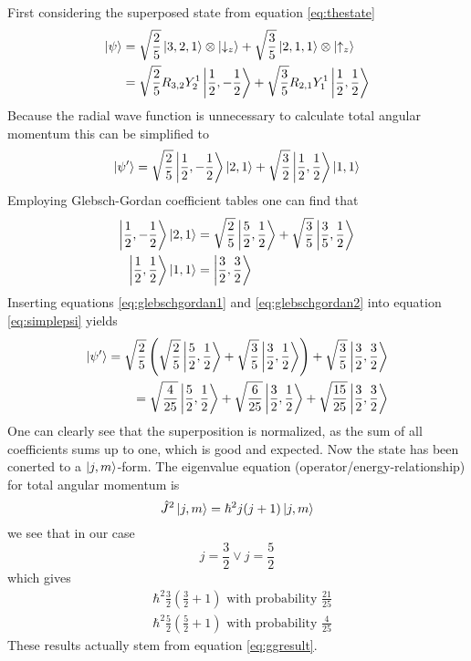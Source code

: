 \documentclass[]{article}
\begin{document}
First considering the superposed state from equation \ref{eq:thestate}
\begin{align*}
\ket{\psi}
&=\sqrt{\frac{2}{5}}\ket{3,2,1}\otimes\ket{\downarrow_z}
+ \sqrt{\frac{3}{5}}\ket{2,1,1}\otimes\ket{\uparrow_z} \\
&=\sqrt{\frac{2}{5}}R_{3,2}Y_2^1\ket{\frac{1}{2},-\frac{1}{2}}
+ \sqrt{\frac{3}{5}}R_{2,1}Y_1^1\ket{\frac{1}{2},\frac{1}{2}}
\end{align*}
Because the radial wave function is unnecessary to calculate total angular momentum this can be simplified to
\begin{equation}
\label{eq:simplepsi}
\ket{\psi'}
= \sqrt{\frac{2}{5}}\ket{\frac{1}{2},-\frac{1}{2}}\ket{2,1} 
+ \sqrt{\frac{3}{2}}\ket{\frac{1}{2},\frac{1}{2}}\ket{1,1}
\end{equation}
Employing Glebsch-Gordan coefficient tables one can find that
\begin{align}
\label{eq:glebschgordan1}
\ket{\frac{1}{2},-\frac{1}{2}}\ket{2,1} &=\sqrt{\frac{2}{5}}\ket{\frac{5}{2},\frac{1}{2}}+ \sqrt{\frac{3}{5}}\ket{\frac{3}{5},\frac{1}{2}} \\
\label{eq:glebschgordan2}
\ket{\frac{1}{2},\frac{1}{2}}\ket{1,1} &= \ket{\frac{3}{2},\frac{3}{2}}
\end{align}
Inserting equations \ref{eq:glebschgordan1} and \ref{eq:glebschgordan2} into equation \ref{eq:simplepsi} yields
\begin{align}
\begin{split}
\label{eq:ggresult}
\ket{\psi'} = \sqrt{\frac{2}{5}}\left(\sqrt{\frac{2}{5}}\ket{\frac{5}{2},\frac{1}{2}} + \sqrt{\frac{3}{5}}\ket{\frac{3}{2},\frac{1}{2}}\right) + \sqrt{\frac{3}{5}}\ket{\frac{3}{2},\frac{3}{2}} \\ = \sqrt{\frac{4}{25}}\ket{\frac{5}{2},\frac{1}{2}} + \sqrt{\frac{6}{25}}\ket{\frac{3}{2},\frac{1}{2}}+\sqrt{\frac{15}{25}}\ket{\frac{3}{2},\frac{3}{2}}
\end{split}
\end{align}
One can clearly see that the superposition is normalized, as the sum of all coefficients sums up to one, which is good and expected. Now the state has been conerted to a $\ket{j,m}$-form. The eigenvalue equation (operator/energy-relationship) for total angular momentum is
\begin{equation}
\hat{J}^2\ket{j,m} = \hbar^2j(j+1)\ket{j,m}
\end{equation}
we see that in our case 
\begin{equation*}
j=\frac{3}{2} \lor j=\frac{5}{2}
\end{equation*}
which gives
\begin{align*}
&\hbar^2\frac{3}{2}\left(\frac{3}{2}+1 \right) \text{ with probability } \frac{21}{25}\\
&\hbar^2\frac{5}{2}\left(\frac{5}{2}+1 \right) \text{ with probability } \frac{4}{25}
\end{align*}
These results actually stem from equation \ref{eq:ggresult}.
\end{document}
